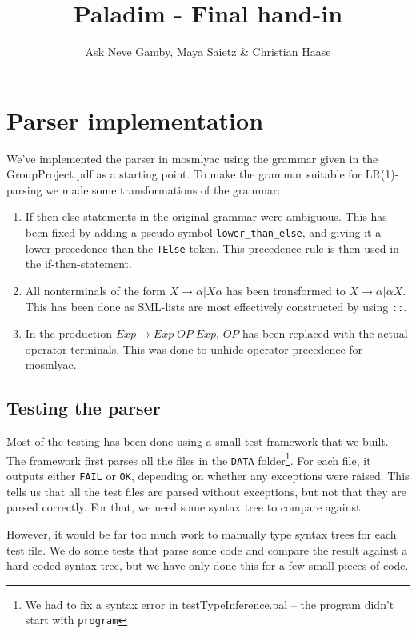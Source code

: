 \documentclass{article}
\title{Paladim - Final hand-in}
\author{Ask Neve Gamby, Maya Saietz \& Christian Haase}
\begin{document}
\maketitle
\tableofcontents
\newpage
\section{Parser implementation}
We've implemented the parser in mosmlyac using the grammar given in the GroupProject.pdf
as a starting point. To make the grammar suitable for LR(1)-parsing we made some
transformations of the grammar:
\begin{enumerate}
  \item If-then-else-statements in the original grammar were ambiguous. This has been
        fixed by adding a pseudo-symbol \texttt{lower\_than\_else}, and giving it a
        lower precedence than the \texttt{TElse} token. This precedence rule is then
        used in the if-then-statement.
  \item All nonterminals of the form $X \rightarrow \alpha | X \alpha$ has been transformed
        to $X \rightarrow \alpha | \alpha X$. This has been done as SML-lists are most
        effectively constructed by using \texttt{::}.
  \item In the production $Exp \rightarrow Exp \; OP \; Exp$, $OP$ has been replaced with
        the actual operator-terminals. This was done to unhide operator precedence for
        mosmlyac.
\end{enumerate}

\subsection{Testing the parser}
Most of the testing has been done using a small test-framework that we built. The framework
first parses all the files in the \texttt{DATA} folder\footnote{We had to fix a syntax error in testTypeInference.pal -- the program didn't start with \texttt{program}}. For each file, it outputs either
\texttt{FAIL} or \texttt{OK}, depending on whether any exceptions were raised. This tells us
that all the test files are parsed without exceptions, but not that they are parsed correctly.
For that, we need some syntax tree to compare against.

However, it would be far too much work to manually type syntax trees for each test file. We do
some tests that parse some code and compare the result against a hard-coded syntax tree, but
we have only done this for a few small pieces of code.
\end{document}
